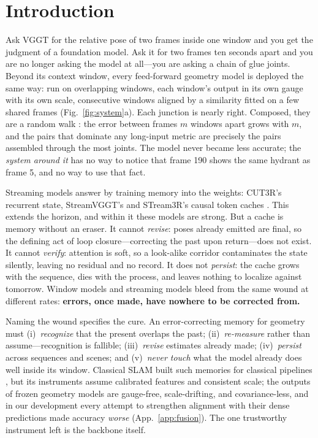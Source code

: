 \documentclass{article}
\begin{document}
\section{Introduction}
\label{sec:intro}

Ask VGGT \citep{vggt} for the relative pose of two frames inside one window
and you get the judgment of a foundation model. Ask it for two frames ten
seconds apart and you are no longer asking the model at all---you are asking
a chain of glue joints. Beyond its context window, every feed-forward
geometry model \citep{vggt,vggtomega,pi3,dust3r,mast3r,fast3r} is deployed
the same way: run on overlapping windows, each window's output in its own
gauge with its own scale, consecutive windows aligned by a similarity fitted
on a few shared frames (Fig.~\ref{fig:system}a). Each junction is nearly
right. Composed, they are a random walk \citep{strasdat}: the error between
frames $m$ windows apart grows with $m$, and the pairs that dominate any
long-input metric are precisely the pairs assembled through the most joints.
The model never became less accurate; the \emph{system around it} has no way
to notice that frame 190 shows the same hydrant as frame 5, and no way to
use that fact.

Streaming models answer by training memory into the weights: CUT3R's
recurrent state, StreamVGGT's and STream3R's causal token caches
\citep{cut3r,streamvggt,stream3r}. This extends the horizon, and within it
these models are strong. But a cache is memory without an eraser. It cannot
\emph{revise}: poses already emitted are final, so the defining act of loop
closure---correcting the past upon return---does not exist. It cannot
\emph{verify}: attention is soft, so a look-alike corridor contaminates the
state silently, leaving no residual and no record. It does not
\emph{persist}: the cache grows with the sequence, dies with the process, and
leaves nothing to localize against tomorrow. Window models and streaming
models bleed from the same wound at different rates: \textbf{errors, once
made, have nowhere to be corrected from.}

Naming the wound specifies the cure. An error-correcting memory for geometry
must (i)~\emph{recognize} that the present overlaps the past;
(ii)~\emph{re-measure} rather than assume---recognition is fallible;
(iii)~\emph{revise} estimates already made; (iv)~\emph{persist} across
sequences and scenes; and (v)~\emph{never touch} what the model already does
well inside its window. Classical SLAM built such memories for classical
pipelines \citep{grisetti,elasticfusion}, but its instruments assume
calibrated features and consistent scale; the outputs of frozen geometry
models are gauge-free, scale-drifting, and covariance-less, and in our
development every attempt to strengthen alignment with their dense
predictions made accuracy \emph{worse} (App.~\ref{app:fusion}). The one
trustworthy instrument left is the backbone itself.
\end{document}
